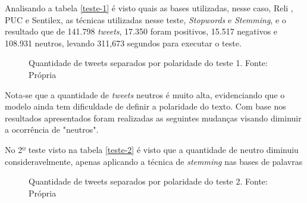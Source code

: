 Analisando a tabela \ref{teste-1} é visto quais as bases utilizadas, nesse caso, Reli , PUC e Sentilex, as técnicas utilizadas nesse teste, \textit{Stopwords} e \textit{Stemming}, e o resultado que de 141.798 \textit{tweets}, 17.350 foram positivos, 15.517 negativos e 108.931 neutros, levando 311,673 segundos para executar o teste.
\begin{figure}[!h]
	\centering{}
	\caption{Quantidade de tweets separados por polaridade do teste 1. Fonte: Própria}
	\label{teste-graf-1}
\end{figure}

Nota-se que a quantidade de \textit{tweets} neutros é muito alta, evidenciando que o modelo ainda tem dificuldade de definir a polaridade do texto. Com base nos resultados apresentados foram realizadas as seguintes mudanças visando diminuir a ocorrência de "neutros".
 

\begin{table}[]
	\caption{2º teste}
	\label{teste-2}
\end{table}

No 2º teste visto na tabela \ref{teste-2} é visto que a quantidade de neutro diminuiu consideravelmente, apenas aplicando a técnica de \textit{stemming} nas bases de palavras
\begin{figure}[!h]
	\centering{}
	\caption{Quantidade de tweets separados por polaridade do teste 2. Fonte: Própria}
	\label{teste-graf-2}
\end{figure}

